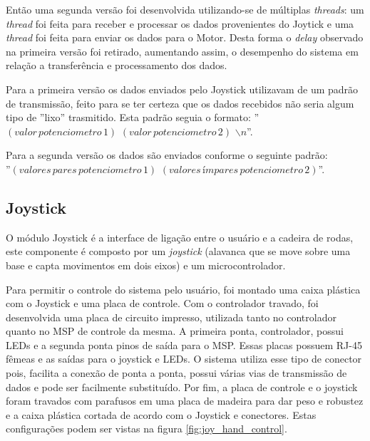   Então uma segunda versão foi desenvolvida utilizando-se de múltiplas \textit{threads}: um \textit{thread} foi feita para receber e processar os dados provenientes do Joytick e uma \textit{thread} foi feita para enviar os dados para o Motor. Desta forma o \textit{delay} observado na primeira versão foi retirado, aumentando assim, o desempenho do sistema em relação a transferência e processamento dos dados.

  Para a primeira versão os dados enviados pelo Joystick utilizavam de um padrão de transmissão, feito para se ter certeza que os dados recebidos não seria algum tipo de ''lixo'' trasmitido. Esta padrão seguia o formato: ''$(valor\, potenciometro\, 1)$ $(valor\, potenciometro\, 2)$ $\backslash n$''.

  Para a segunda versão os dados são enviados conforme o seguinte padrão:\\ ''$(valores\, pares\, potenciometro\, 1)$ $(valores\, ímpares\, potenciometro\, 2)$''.

\subsection{Joystick}

O módulo Joystick é a interface de ligação entre o usuário e a cadeira de rodas, este componente é composto por um \textit{joystick} (alavanca que se move sobre uma base e capta movimentos em dois eixos) e um microcontrolador.

Para permitir o controle do sistema pelo usuário, foi montado uma caixa plástica com o Joystick e uma placa de controle. Com o controlador travado, foi desenvolvida uma placa de circuito impresso, utilizada tanto no controlador quanto no MSP de controle da mesma. A primeira ponta, controlador, possui LEDs e a segunda ponta pinos de saída para o MSP. Essas placas possuem RJ-45 fêmeas e as saídas para o joystick e LEDs. O sistema utiliza esse tipo de conector pois, facilita a conexão de ponta a ponta, possui várias vias de transmissão de dados e pode ser facilmente substituído. Por fim, a placa de controle e o joystick foram travados com parafusos em uma placa de madeira para dar peso e robustez e a caixa plástica cortada de acordo com o Joystick e conectores. Estas configurações podem ser vistas na figura \ref{fig:joy_hand_control}.

